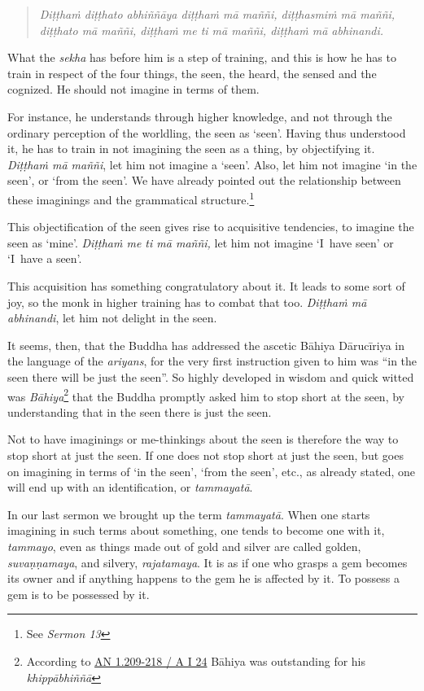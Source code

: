 \begin{quote}
\emph{Diṭṭhaṁ diṭṭhato abhiññāya diṭṭhaṁ mā maññi, diṭṭhasmiṁ mā maññi, diṭṭhato mā maññi, diṭṭhaṁ me ti mā maññi, diṭṭhaṁ mā abhinandi.}
\end{quote}

What the \emph{sekha} has before him is a step of training, and this is how he has to train in respect of the four things, the seen, the heard, the sensed and the cognized. He should not imagine in terms of them.

For instance, he understands through higher knowledge, and not through the ordinary perception of the worldling, the seen as `seen'. Having thus understood it, he has to train in not imagining the seen as a thing, by objectifying it. \emph{Diṭṭhaṁ mā maññi}, let him not imagine a `seen'. Also, let him not imagine `in the seen', or `from the seen'. We have already pointed out the relationship between these imaginings and the grammatical structure.\footnote{See \emph{Sermon 13}}

This objectification of the seen gives rise to acquisitive tendencies, to imagine the seen as `mine'. \emph{Diṭṭhaṁ me ti mā maññi,} let him not imagine `I~have seen' or `I~have a seen'.

This acquisition has something congratulatory about it. It leads to some sort of joy, so the monk in higher training has to combat that too. \emph{Diṭṭhaṁ mā abhinandi}, let him not delight in the seen.

It seems, then, that the Buddha has addressed the ascetic Bāhiya Dārucīriya in the language of the \emph{ariyans}, for the very first instruction given to him was ``in the seen there will be just the seen''. So highly developed in wisdom and quick witted was \emph{Bāhiya}\footnote{According to \href{https://suttacentral.net/an1.209-218/pli/ms}{AN 1.209-218 / A I 24} Bāhiya was outstanding for his \emph{khippābhiññā}} that the Buddha promptly asked him to stop short at the seen, by understanding that in the seen there is just the seen.

Not to have imaginings or me-thinkings about the seen is therefore the way to stop short at just the seen. If one does not stop short at just the seen, but goes on imagining in terms of `in the seen', `from the seen', etc., as already stated, one will end up with an identification, or \emph{tammayatā}.

In our last sermon we brought up the term \emph{tammayatā}. When one starts imagining in such terms about something, one tends to become one with it, \emph{tammayo}, even as things made out of gold and silver are called golden, \emph{suvaṇṇamaya}, and silvery, \emph{rajatamaya}. It is as if one who grasps a gem becomes its owner and if anything happens to the gem he is affected by it. To possess a gem is to be possessed by it.


